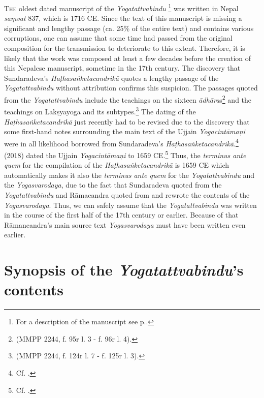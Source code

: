 \lettrine[lines=2, lhang=0.2, loversize=0.25]{T}{he} oldest dated manuscript of the \textit{Yogatattvabindu} \footnote{For a description of the manuscript see  p.\pageref{n1description}.} was written in Nepal \textit{saṃvat} 837, which is 1716 CE. Since the text of this manuscript is missing a significant and lengthy passage (ca. 25\% of the entire text) and contains various corruptions, one can assume that some time had passed from the original composition for the transmission to deteriorate to this extent. Therefore, it is likely that the work was composed at least a few decades before the creation of this Nepalese manuscript, sometime in the 17th century. The discovery that Sundaradeva's \textit{Haṭhasaṅketacandrikā} quotes a lengthy passage of the \textit{Yogatattvabindu} without attribution confirms this suspicion. The passages quoted from the \textit{Yogatattvabindu} include the teachings on the sixteen \textit{ādhāra}s\footnote{ (MMPP 2244, f. 95r l. 3 - f. 96r l. 4).} and the teachings on Lakṣyayoga and its subtypes.\footnote{ (MMPP 2244, f. 124r l. 7 - f. 125r l. 3).} The dating of the \textit{Haṭhasaṅketacandrikā} just recently had to be revised due to the discovery that some first-hand notes surrounding the main text of the Ujjain \textit{Yogacintāmaṇi} were in all likelihood borrowed from Sundaradeva's \textit{Haṭhasaṅketacandrikā}.\footnote{Cf. \citeauthor[2024: 52-54]{birch2024}.} \citeauthor{birch2018proliferation} (2018) dated the Ujjain \textit{Yogacintāmaṇi} to 1659 CE.\footnote{Cf. \citeauthor[2018: 50, n. 111]{birch2018proliferation}.} Thus, the \textit{terminus ante quem} for the compilation of the \textit{Haṭhasaṅketacandrikā} is 1659 CE which automatically makes it also the \textit{terminus ante quem} for the \textit{Yogatattvabindu} and the \textit{Yogasvarodaya}, due to the fact that Sundaradeva quoted from the \textit{Yogatattvabindu} and Rāmacandra quoted from and rewrote the contents of the \textit{Yogasvarodaya}. Thus, we can safely assume that the \textit{Yogatattvabindu} was written in the course of the first half of the 17th century or earlier. Because of that Rāmancandra's main source text \textit{Yogasvarodaya} must have been written even earlier.

\section{Synopsis of the \emph{Yogatattvabindu}'s contents}

